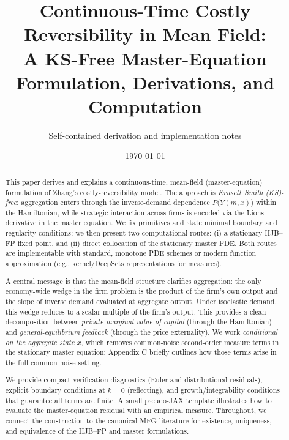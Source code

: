 ﻿\documentclass[11pt,letterpaper,oneside]{article}
\title{\vspace{-1.5em}Continuous-Time Costly Reversibility in Mean Field:\\
A KS-Free Master-Equation Formulation, Derivations, and Computation}
\author{%
\small Self-contained derivation and implementation notes
}
\date{\small \today}
\numberwithin{equation}{section}
\newcommand{\ac}[1]{{\mdseries\textsc{#1}}}
\newcommand{\1}{\mathbf{1}}
\begin{document}
\maketitle

\begin{abstract}
\noindent
This paper derives and explains a continuous-time, mean-field (master-equation) formulation of Zhang's costly-reversibility model. The approach is \emph{Krusell--Smith (KS)-free}: aggregation enters through the inverse-demand dependence $P\big(Y(m,x)\big)$ within the Hamiltonian, while strategic interaction across firms is encoded via the Lions derivative in the master equation. We fix primitives and state minimal boundary and regularity conditions; we then present two computational routes: (i) a stationary \ac{HJB}--\ac{FP} fixed point, and (ii) direct collocation of the stationary master \ac{PDE}. Both routes are implementable with standard, monotone PDE schemes or modern function approximation (e.g., kernel/DeepSets representations for measures).

A central message is that the mean-field structure clarifies aggregation: the only economy-wide wedge in the firm problem is the product of the firm's own output and the slope of inverse demand evaluated at aggregate output. Under isoelastic demand, this wedge reduces to a scalar multiple of the firm's output. This provides a clean decomposition between \emph{private marginal value of capital} (through the Hamiltonian) and \emph{general-equilibrium feedback} (through the price externality). We work \emph{conditional on the aggregate state $x$}, which removes common-noise second-order measure terms in the stationary master equation; Appendix C briefly outlines how those terms arise in the full common-noise setting.

We provide compact verification diagnostics (Euler and distributional residuals), explicit boundary conditions at $k=0$ (reflecting), and growth/integrability conditions that guarantee all terms are finite. A small pseudo-JAX template illustrates how to evaluate the master-equation residual with an empirical measure. Throughout, we connect the construction to the canonical \ac{MFG} literature for existence, uniqueness, and equivalence of the \ac{HJB}--\ac{FP} and master formulations.
\end{abstract}

\tableofcontents

\end{document}
